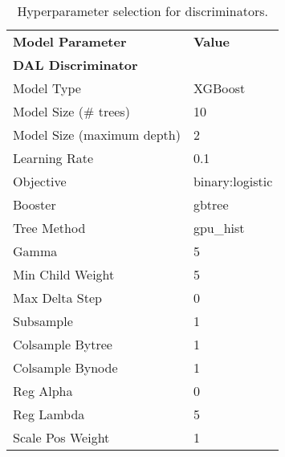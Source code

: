 \vspace{.5cm}
\begin{table*}[t]
	\small
	\centering
	\begin{tabular}{ll}
		\toprule
		\textbf{Model Parameter} & \textbf{Value} \\
		\textbf{DAL Discriminator} & {} \\
		\midrule
		Model Type & XGBoost \\
		Model Size (\# trees) &  10\\
		Model Size (maximum depth) &  2\\
		\midrule
		Learning Rate &  0.1\\
		Objective &  binary:logistic\\
		Booster & gbtree\\
		Tree Method & gpu\_hist\\
		Gamma & 5 \\
		Min Child Weight & 5 \\
		Max Delta Step & 0 \\
		Subsample & 1 \\
		Colsample Bytree & 1 \\
		Colsample Bynode & 1 \\
		Reg Alpha & 0 \\
		Reg Lambda & 5 \\
		Scale Pos Weight & 1 \\
		\bottomrule
	\end{tabular}
	\caption{Hyperparameter selection for \dal{} discriminators.}
	\label{tbl:dal-hyperparams}
\end{table*}